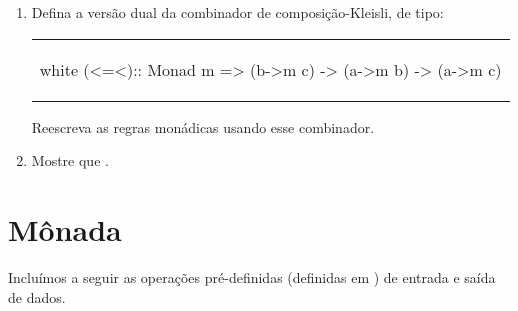 \begin{enumerate}

\item Defina a versão dual da combinador de composição-Kleisli, de
  tipo:

\begin{center}
\begin{tabular}{l}
\begin{alg}{.5\textwidth}{white}
  (<=<):: Monad m => (b->m c) -> (a->m b) -> (a->m c)
\end{alg}
\end{tabular}
\end{center}

Reescreva as regras monádicas usando esse combinador.

\item Mostre que .

\end{enumerate}

\section{Mônada \IO}
\label{Monada-IO}

Incluímos a seguir as operações pré-definidas (definidas em \Prelude)
de entrada e saída de dados.

